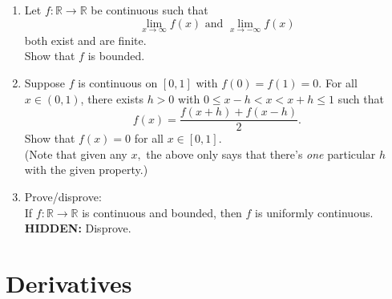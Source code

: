 \documentclass[12pt]{article}
\theoremstyle{definition}
\numberwithin{thm}{section}
\newcommand{\hint}[1]{\textbf{HIDDEN:} {\color[rgb]{0.95, 0.95, 0.95}#1}}
\begin{document}
\begin{enumerate}
	\item Let $f:\mathbb{R} \to \mathbb{R}$ be continuous such that
	\begin{equation*} 
		\lim_{x\to \infty}f(x) \text{ and } \lim_{x\to -\infty}f(x)
	\end{equation*}
	both exist and are finite.\\
	Show that $f$ is bounded.
	\item Suppose $f$ is continuous on $[0, 1]$ with $f(0) = f(1) = 0.$ For all $x\in (0, 1)$, there exists $h > 0$ with $0 \le x - h < x < x + h \le 1$ such that 
	\begin{equation*} 
		f(x)=\dfrac{f(x + h) + f(x - h)}{2}.
	\end{equation*} 
	Show that $f(x) = 0$ for all $x \in [0, 1].$\\
	(Note that given any $x,$ the above only says that there's \emph{one} particular $h$ with the given property.)
	\item Prove/disprove:\\
	If $f:\mathbb{R} \to \mathbb{R}$ is continuous and bounded, then $f$ is uniformly continuous.\\
	\hint{Disprove.}
\end{enumerate}
\newpage\section{Derivatives}
\end{document}
